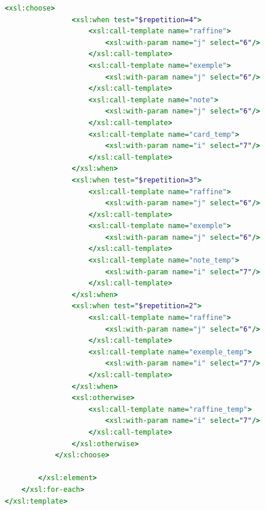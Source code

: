 \documentclass[11pt]{report}
\begin{document}
\begin{lstlisting}[language=XSLT]
            <xsl:choose>
                <xsl:when test="$repetition=4">
                    <xsl:call-template name="raffine">
                        <xsl:with-param name="j" select="6"/>
                    </xsl:call-template>
                    <xsl:call-template name="exemple">
                        <xsl:with-param name="j" select="6"/>
                    </xsl:call-template>
                    <xsl:call-template name="note">
                        <xsl:with-param name="j" select="6"/>
                    </xsl:call-template>
                    <xsl:call-template name="card_temp">
                        <xsl:with-param name="i" select="7"/>
                    </xsl:call-template>
                </xsl:when>
                <xsl:when test="$repetition=3">
                    <xsl:call-template name="raffine">
                        <xsl:with-param name="j" select="6"/>
                    </xsl:call-template>
                    <xsl:call-template name="exemple">
                        <xsl:with-param name="j" select="6"/>
                    </xsl:call-template>
                    <xsl:call-template name="note_temp">
                        <xsl:with-param name="i" select="7"/>
                    </xsl:call-template>                    
                </xsl:when>
                <xsl:when test="$repetition=2">
                    <xsl:call-template name="raffine">
                        <xsl:with-param name="j" select="6"/>
                    </xsl:call-template>
                    <xsl:call-template name="exemple_temp">
                        <xsl:with-param name="i" select="7"/>
                    </xsl:call-template>
                </xsl:when>
                <xsl:otherwise>
                    <xsl:call-template name="raffine_temp">
                        <xsl:with-param name="i" select="7"/>
                    </xsl:call-template>                    
                </xsl:otherwise>
            </xsl:choose>

        </xsl:element>
    </xsl:for-each>        
</xsl:template> 
\end{lstlisting}
\end{document}
